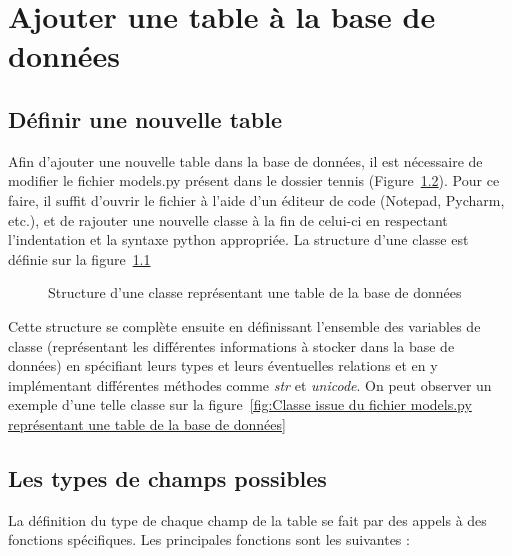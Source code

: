 \chapter{Ajouter une table à la base de données}

\section{Définir une nouvelle table}

Afin d'ajouter une nouvelle table dans la base de données, il est nécessaire de modifier le fichier models.py présent dans le dossier tennis (Figure~\ref{}). Pour ce faire, il suffit d'ouvrir le fichier à l'aide d'un éditeur de code (Notepad, Pycharm, etc.), et de rajouter une nouvelle classe à la fin de celui-ci en respectant l'indentation et la syntaxe python appropriée. La structure d'une classe est définie sur la figure~\ref{fig:Structure d'une classe représentant une table de la base de données}

\begin{figure}[!ht]
\centering
\begin{framed}

\end{framed}
\caption{Structure d'une classe représentant une table de la base de données}
\label{fig:Structure d'une classe représentant une table de la base de données}
\end{figure}
\FloatBarrier

Cette structure se complète ensuite en définissant l'ensemble des variables de classe (représentant les différentes informations à stocker dans la base de données) en spécifiant leurs types et leurs éventuelles relations et en y implémentant différentes méthodes comme \textit{str} et \textit{unicode}. On peut observer un exemple d'une telle classe sur la figure~\ref{fig:Classe issue du fichier models.py représentant une table de la base de données}

\section{Les types de champs possibles}

La définition du type de chaque champ de la table se fait par des appels à des fonctions spécifiques. Les principales fonctions sont les suivantes :\\

